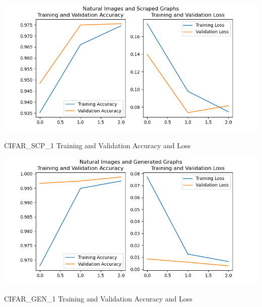\documentclass[12pt]{article}
\begin{document}
            \begin{table}
            
                \begin{center}

                    \includegraphics[scale=0.8]{CIFAR_SCP_1_HIST_RESULTS.png}
                    \caption{CIFAR\_SCP\_1 Training and Validation Accuracy and Loss}
                    \label{cifar-scp-acc-loss}
        
                \end{center}
                
        
            
                \begin{center}

                    \includegraphics[scale=0.8]{CIFAR_GEN_1_HIST_RESULTS.png}
                    \caption{CIFAR\_GEN\_1 Training and Validation Accuracy and Loss}
                    \label{cifar-gen-acc-loss}
        
                \end{center}

            \end{table}
\end{document}
